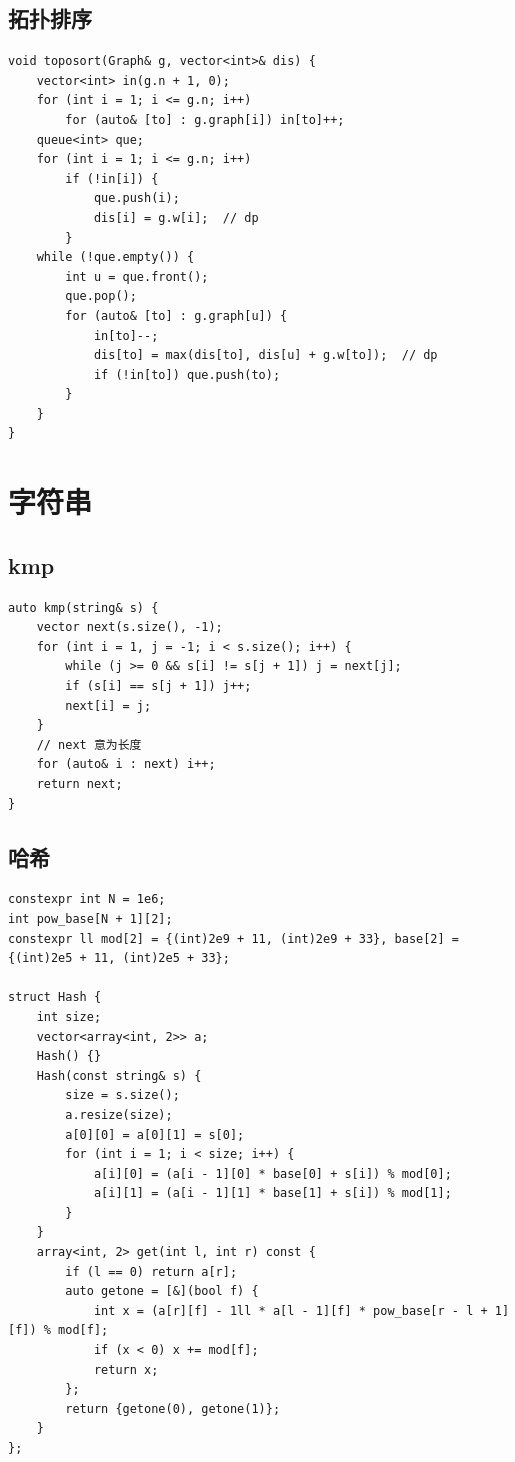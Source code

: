 \documentclass[UTF8, twoside]{ctexart}
\begin{document}
\begin{sloppypar}
\subsection{拓扑排序}

\begin{lstlisting}[style=cpp]
void toposort(Graph& g, vector<int>& dis) {
    vector<int> in(g.n + 1, 0);
    for (int i = 1; i <= g.n; i++)
        for (auto& [to] : g.graph[i]) in[to]++;
    queue<int> que;
    for (int i = 1; i <= g.n; i++)
        if (!in[i]) {
            que.push(i);
            dis[i] = g.w[i];  // dp
        }
    while (!que.empty()) {
        int u = que.front();
        que.pop();
        for (auto& [to] : g.graph[u]) {
            in[to]--;
            dis[to] = max(dis[to], dis[u] + g.w[to]);  // dp
            if (!in[to]) que.push(to);
        }
    }
}
\end{lstlisting}

\clearpage

\section{字符串}

\subsection{kmp}

\begin{lstlisting}[style=cpp]
auto kmp(string& s) {
    vector next(s.size(), -1);
    for (int i = 1, j = -1; i < s.size(); i++) {
        while (j >= 0 && s[i] != s[j + 1]) j = next[j];
        if (s[i] == s[j + 1]) j++;
        next[i] = j;
    }
    // next 意为长度
    for (auto& i : next) i++;
    return next;
}
\end{lstlisting}

\subsection{哈希}

\begin{lstlisting}[style=cpp]
constexpr int N = 1e6;
int pow_base[N + 1][2];
constexpr ll mod[2] = {(int)2e9 + 11, (int)2e9 + 33}, base[2] = {(int)2e5 + 11, (int)2e5 + 33};

struct Hash {
    int size;
    vector<array<int, 2>> a;
    Hash() {}
    Hash(const string& s) {
        size = s.size();
        a.resize(size);
        a[0][0] = a[0][1] = s[0];
        for (int i = 1; i < size; i++) {
            a[i][0] = (a[i - 1][0] * base[0] + s[i]) % mod[0];
            a[i][1] = (a[i - 1][1] * base[1] + s[i]) % mod[1];
        }
    }
    array<int, 2> get(int l, int r) const {
        if (l == 0) return a[r];
        auto getone = [&](bool f) {
            int x = (a[r][f] - 1ll * a[l - 1][f] * pow_base[r - l + 1][f]) % mod[f];
            if (x < 0) x += mod[f];
            return x;
        };
        return {getone(0), getone(1)};
    }
};


\end{lstlisting}
\end{sloppypar}
\end{document}
